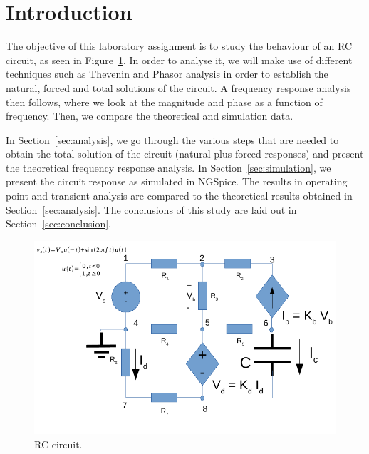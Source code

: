 \section{Introduction}
\label{sec:introduction}
The objective of this laboratory assignment is to study the behaviour of an RC circuit, as seen in Figure~\ref{fig:rc}. In order to analyse it, we will make use of different techniques such as Thevenin and Phasor analysis in order to establish the natural, forced and total solutions of the circuit. A frequency response analysis then follows, where we look at the magnitude and phase as a function of frequency. Then, we compare the theoretical and simulation data.

In Section~\ref{sec:analysis}, we go through the various steps that are needed to obtain the total solution of the circuit (natural plus forced responses) and present the theoretical frequency response analysis.
In Section~\ref{sec:simulation}, we present the circuit response as simulated in NGSpice. The results in operating point and transient analysis are compared to the theoretical results obtained in Section~\ref{sec:analysis}. The conclusions of this study are laid out in
Section~\ref{sec:conclusion}.

\begin{figure}[h] \centering
\includegraphics[width=0.9\linewidth]{rc.pdf}
\caption{RC circuit.}
\label{fig:rc}
\end{figure}

